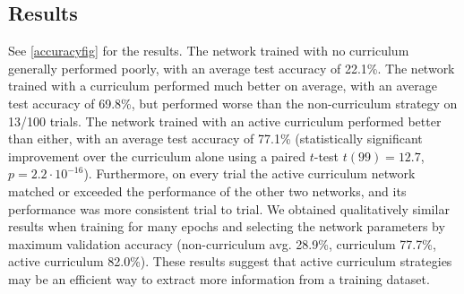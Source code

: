 \documentclass{article}
\begin{document}
\subsection{Results}
See \ref{accuracyfig} for the results. The network trained with no curriculum generally performed poorly, with an average test accuracy of 22.1\%. The network trained with a curriculum performed much better on average, with an average test accuracy of 69.8\%, but performed worse than the non-curriculum strategy on 13/100 trials. The network trained with an active curriculum performed better than either, with an average test accuracy of 77.1\% (statistically significant improvement over the curriculum alone using a paired $t$-test $t(99) = 12.7$, $p = 2.2\cdot 10^{-16}$). Furthermore, on every trial the active curriculum network matched or exceeded the performance of the other two networks, and its performance was more consistent trial to trial. We obtained qualitatively similar results when training for many epochs and selecting the network parameters by maximum validation accuracy (non-curriculum avg. 28.9\%, curriculum 77.7\%, active curriculum 82.0\%). These results suggest that active curriculum strategies may be an efficient way to extract more information from a training dataset. 
{\small

}
\end{document}
